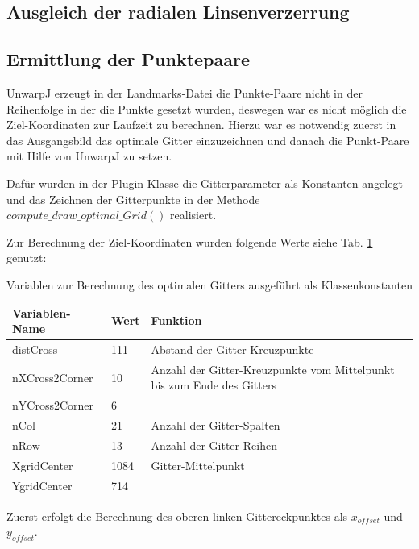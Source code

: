\subsection{Ausgleich der radialen Linsenverzerrung}

\subsection{Ermittlung der Punktepaare}

UnwarpJ erzeugt in der Landmarks-Datei die Punkte-Paare nicht in der Reihenfolge in der die Punkte  gesetzt wurden, deswegen war es nicht möglich die Ziel-Koordinaten zur Laufzeit zu berechnen. Hierzu war es notwendig zuerst in das Ausgangsbild das optimale Gitter einzuzeichnen und danach die Punkt-Paare mit Hilfe von UnwarpJ zu setzen.

Dafür wurden in der Plugin-Klasse die Gitterparameter als Konstanten angelegt und das Zeichnen der Gitterpunkte in der Methode $compute\_draw\_optimal\_Grid()$ realisiert.

Zur Berechnung der Ziel-Koordinaten wurden folgende Werte siehe Tab. \ref{tab:gitter_koordinaten_variablen} genutzt:

\begin{table}[H]
\centering
\begin{tabular}{|l|l|p{}|}
\toprule
Variablen-Name & Wert & Funktion\\
\midrule
distCross & 111 & Abstand der Gitter-Kreuzpunkte\\
\midrule
nXCross2Corner & 10 & Anzahl der Gitter-Kreuzpunkte vom Mittelpunkt bis zum Ende des Gitters\\
nYCross2Corner & 6 & \\
\midrule
nCol & 21 & Anzahl der Gitter-Spalten\\
nRow & 13 & Anzahl der Gitter-Reihen\\
\midrule
XgridCenter & 1084 & Gitter-Mittelpunkt \\
YgridCenter & 714 & \\
\bottomrule
\end{tabular}
\caption{Variablen zur Berechnung des optimalen Gitters ausgeführt als Klassenkonstanten}
\label{tab:gitter_koordinaten_variablen}
\end{table}

Zuerst erfolgt die Berechnung des oberen-linken Gittereckpunktes als $x_{offset}$ und $y_{offset}$. 

